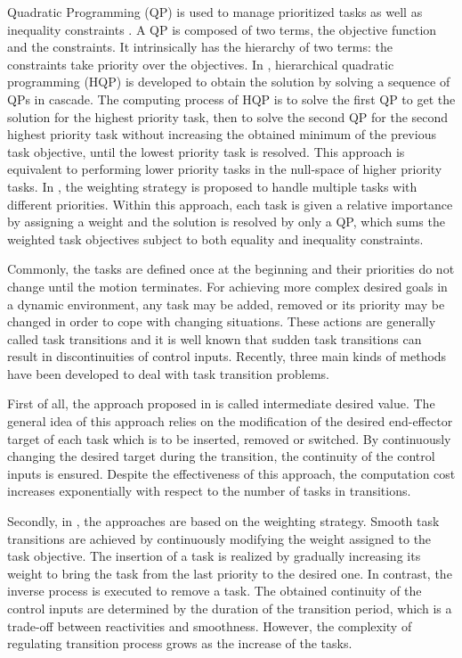 Quadratic Programming (QP) is used to manage prioritized tasks as well as inequality constraints \cite{siciliano1991,zhang2004,decre2009}. A QP is composed of two terms, the objective function and the constraints. It intrinsically has the hierarchy of two terms: the constraints take priority over the objectives. In \cite{kanoun2011,saab2013,escande2014}, hierarchical quadratic programming (HQP) is developed to obtain the solution by solving a sequence of QPs in cascade. The computing process of HQP is to solve the first QP to get the solution for the highest priority task, then to solve the second QP for the second highest priority task without increasing the obtained minimum of the previous task objective, until the lowest priority task is resolved. This approach is equivalent to performing lower priority tasks in the null-space of higher priority tasks. In \cite{abe2007,collette2007,salini2011,liu2012}, the weighting strategy is proposed to handle multiple tasks with different priorities. Within this approach, each task is given a relative importance by assigning a weight and the solution is resolved by only a QP, which sums the weighted task objectives subject to both equality and inequality constraints.  

Commonly, the tasks are defined once at the beginning and their priorities do not change until the motion terminates. For achieving more complex desired goals in a dynamic environment, any task may be added, removed or its priority may be changed in order to cope with changing situations. These actions are generally called task transitions and it is well known that sudden task transitions can result in discontinuities of control inputs. Recently, three main kinds of methods have been developed to deal with task transition problems.

First of all, the approach proposed in \cite{lee2012} is called intermediate desired value. The general idea of this approach relies on the modification of the desired end-effector target of each task which is to be inserted, removed or switched. By continuously changing the desired target during the transition, the continuity of the control inputs is ensured. Despite the effectiveness of this approach, the computation cost increases exponentially with respect to the number of tasks in transitions. 

Secondly, in \cite{keith2011,salini2011,jarquin2013}, the approaches are based on the weighting strategy. Smooth task transitions are achieved by continuously modifying the weight assigned to the task objective. The insertion of a task is realized by gradually increasing its weight to bring the task from the last priority to the desired one. In contrast, the inverse process is executed to remove a task. The obtained continuity of the control inputs are determined by the duration of the transition period, which is a trade-off between reactivities and smoothness. However, the complexity of regulating transition process grows as the increase of the tasks.

